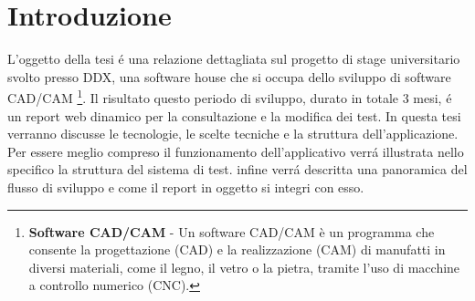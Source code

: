 \chapter{Introduzione}
    L'oggetto della tesi \'e una relazione dettagliata sul progetto di stage universitario svolto presso DDX,
    una software house che si occupa dello sviluppo di software CAD/CAM
    \footnote{\textbf{Software CAD/CAM} - Un software CAD/CAM è un programma che consente la progettazione (CAD)
    e la realizzazione (CAM) di manufatti in diversi materiali, come il legno, il vetro o la pietra, tramite 
    l'uso di macchine a controllo numerico (CNC).}.
    Il risultato questo periodo di sviluppo, durato in totale 3 mesi, \'e un report web dinamico per la consultazione e la modifica dei test. 
    In questa tesi verranno discusse le tecnologie, le scelte tecniche e la struttura dell'applicazione.
    Per essere meglio compreso il funzionamento dell'applicativo verr\'a illustrata nello specifico la struttura del sistema di test.
    infine verr\'a descritta una panoramica del flusso di sviluppo e come il report in oggetto si integri con esso. 